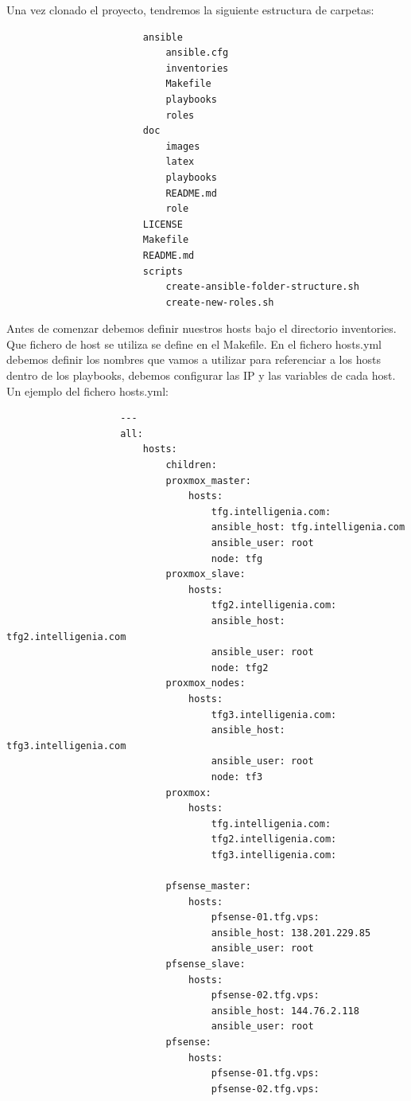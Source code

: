 				\begin{paragraph}
					Una vez clonado el proyecto, tendremos la siguiente estructura de carpetas:
					\lstset{language=Bash}
					\begin{lstlisting}
						ansible
							ansible.cfg
							inventories
							Makefile
							playbooks
							roles
						doc
							images
							latex
							playbooks
							README.md
							role
						LICENSE
						Makefile
						README.md
						scripts
							create-ansible-folder-structure.sh
							create-new-roles.sh  
					\end{lstlisting}
					
					Antes de comenzar debemos definir nuestros hosts bajo el directorio inventories. Que fichero de host se utiliza se define en el Makefile. En el fichero hosts.yml debemos definir los nombres que vamos a utilizar para referenciar a los hosts dentro de los playbooks, debemos configurar las IP y las variables de cada host. Un ejemplo del fichero hosts.yml:
					\clearpage 
					
					\lstset{language=xml}
					\begin{lstlisting}
					---
					all:
			 			hosts:
				  			children:
							proxmox_master:
								hosts:
									tfg.intelligenia.com:
									ansible_host: tfg.intelligenia.com  
									ansible_user: root
									node: tfg
							proxmox_slave:
								hosts:
									tfg2.intelligenia.com:
									ansible_host: tfg2.intelligenia.com 
									ansible_user: root
									node: tfg2
							proxmox_nodes:
								hosts:
									tfg3.intelligenia.com:
									ansible_host: tfg3.intelligenia.com 
									ansible_user: root
									node: tf3
							proxmox:
								hosts:
									tfg.intelligenia.com:
									tfg2.intelligenia.com:
									tfg3.intelligenia.com:
							
							pfsense_master:
								hosts:
									pfsense-01.tfg.vps:
									ansible_host: 138.201.229.85
									ansible_user: root  
							pfsense_slave:
								hosts:
									pfsense-02.tfg.vps:
									ansible_host: 144.76.2.118
									ansible_user: root  
							pfsense:
								hosts:
									pfsense-01.tfg.vps:
									pfsense-02.tfg.vps:
					\end{lstlisting}
					
				\end{paragraph}
